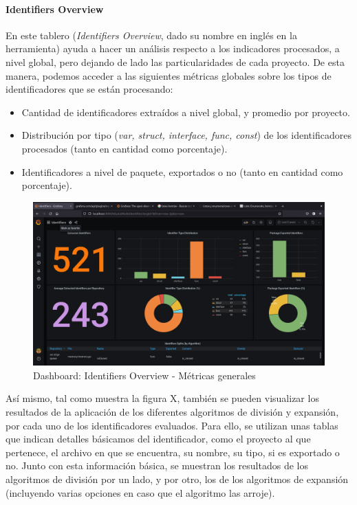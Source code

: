 \paragraph{Identifiers Overview}
En este tablero (\textit{Identifiers Overview}, dado su nombre en inglés en la herramienta)
ayuda a hacer un análisis respecto a los indicadores procesados, a nivel global, pero
dejando de lado las particularidades de cada proyecto.
De esta manera, podemos acceder a las siguientes métricas globales sobre los tipos de
identificadores que se están procesando:

\begin{itemize}
  \item Cantidad de identificadores extraídos a nivel global, y promedio por proyecto.
  \item Distribución por tipo (\textit{var, struct, interface, func, const}) de los
  identificadores procesados (tanto en cantidad como porcentaje).
  \item Identificadores a nivel de paquete, exportados o no (tanto en cantidad como porcentaje).
\end{itemize}

\begin{figure}[H]
  \includegraphics[width=12cm]{implementation/dashboard_identifiers_details_part1.png}
  \centering
  \caption{Dashboard: Identifiers Overview - Métricas generales}
\end{figure}

Así mismo, tal como muestra la figura X, también se pueden visualizar los resultados
de la aplicación de los diferentes algoritmos de división y expansión, por cada uno
de los identificadores evaluados.
Para ello, se utilizan unas tablas que indican detalles básicamos del identificador,
como el proyecto al que pertenece, el archivo en que se encuentra, su nombre, su tipo,
si es exportado o no.
Junto con esta información básica, se muestran los resultados de los algoritmos de división
por un lado, y por otro, los de los algoritmos de expansión (incluyendo varias opciones en
caso que el algoritmo las arroje).


